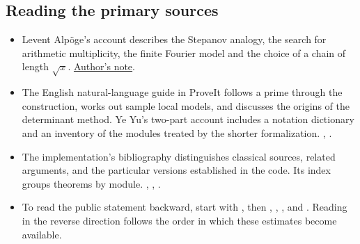 \subsection{Reading the primary sources}
\begin{itemize}
 \item Levent Alpöge's account describes the Stepanov analogy, the search for arithmetic multiplicity, the finite Fourier model and the choice of a chain of length \(\sqrt x\). \href{https://alpo.ge/remark.pdf}{Author's note}.
 \item The English natural-language guide in ProveIt follows a prime through the construction, works out sample local models, and discusses the origins of the determinant method. Ye Yu's two-part account includes a notation dictionary and an inventory of the modules treated by the shorter formalization. , .
 \item The implementation's bibliography distinguishes classical sources, related arguments, and the particular versions established in the code. Its index groups theorems by module. , , .
 \item To read the public statement backward, start with , then , , , and . Reading in the reverse direction follows the order in which these estimates become available.
\end{itemize}
